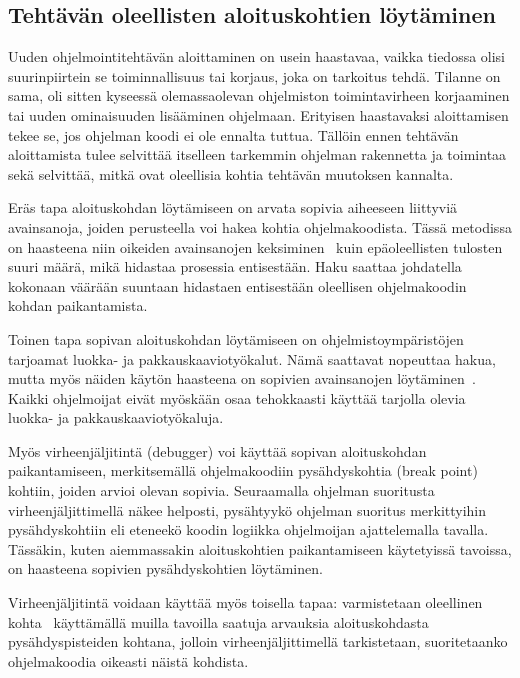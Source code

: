 \documentclass[finnish]{tktltiki2}
\theoremstyle{definition}
\theoremstyle{remark}
\begin{document}
\subsection{Tehtävän oleellisten aloituskohtien löytäminen}

Uuden ohjelmointitehtävän aloittaminen on usein haastavaa, vaikka tiedossa olisi suurinpiirtein se toiminnallisuus tai korjaus, joka on tarkoitus tehdä. Tilanne on sama, oli sitten kyseessä olemassaolevan ohjelmiston toimintavirheen korjaaminen tai uuden ominaisuuden lisääminen ohjelmaan. Erityisen haastavaksi aloittamisen tekee se, jos ohjelman koodi ei ole ennalta tuttua. Tällöin ennen tehtävän aloittamista tulee selvittää itselleen tarkemmin ohjelman rakennetta ja toimintaa sekä selvittää, mitkä ovat oleellisia kohtia tehtävän muutoksen kannalta.

Eräs tapa aloituskohdan löytämiseen on arvata sopivia aiheeseen liittyviä avainsanoja, joiden perusteella voi hakea kohtia ohjelmakoodista. Tässä metodissa on haasteena niin oikeiden avainsanojen keksiminen~\cite{what-to-search-for} kuin epäoleellisten tulosten suuri määrä, mikä hidastaa prosessia entisestään. Haku saattaa johdatella kokonaan väärään suuntaan hidastaen entisestään oleellisen ohjelmakoodin kohdan paikantamista.

Toinen tapa sopivan aloituskohdan löytämiseen on ohjelmistoympäristöjen tarjoamat luokka- ja pakkauskaaviotyökalut. Nämä saattavat nopeuttaa hakua, mutta myös näiden käytön haasteena on sopivien avainsanojen löytäminen~\cite{what-to-search-for}. Kaikki ohjelmoijat eivät myöskään osaa tehokkaasti käyttää tarjolla olevia luokka- ja pakkauskaaviotyökaluja.

Myös virheenjäljitintä (debugger) voi käyttää sopivan aloituskohdan paikantamiseen, merkitsemällä ohjelmakoodiin pysähdyskohtia (break point) kohtiin, joiden arvioi olevan sopivia.
Seuraamalla ohjelman suoritusta virheenjäljittimellä näkee helposti, pysähtyykö ohjelman suoritus merkittyihin pysähdyskohtiin eli eteneekö koodin logiikka ohjelmoijan ajattelemalla tavalla.
Tässäkin, kuten aiemmassakin aloituskohtien paikantamiseen käytetyissä tavoissa, on haasteena sopivien pysähdyskohtien löytäminen.

Virheenjäljitintä voidaan käyttää myös toisella tapaa: varmistetaan oleellinen kohta~\cite{eliciting-design-requirements-for-maintenance-oriented-ides} käyttämällä muilla tavoilla saatuja arvauksia aloituskohdasta pysähdyspisteiden kohtana, jolloin virheenjäljittimellä tarkistetaan, suoritetaanko ohjelmakoodia oikeasti näistä kohdista.
\end{document}
